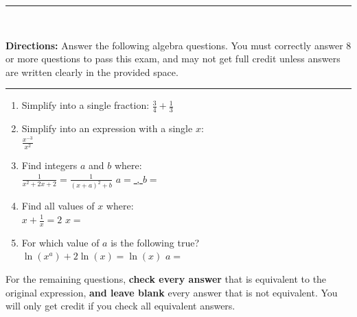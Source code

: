 \documentclass{article}
\makeatletter
\def\saveenum{\xdef\@savedenum{\the\c@enumi\relax}}
\def\resetenum{\global\c@enumi\@savedenum}
\makeatother
\begin{document}
\pagestyle{empty}
\hrule\ \\
{{\bf Directions:} Answer the following algebra questions.  You must correctly answer 8 or more questions to pass this exam, and may not get full credit unless answers are written clearly in the provided space.\\

\hrule
\begin{enumerate}
\item Simplify into a single fraction:
 $\frac{3}{4} + \frac{1}{3}$\\
\- \hfill \underline{\hspace{2 in}} 
%
%
\item Simplify into an expression with a single $x$:  \,\\[.1 in]
$\displaystyle \frac{x^{-3}}{x^2}$\hfill \underline{\hspace{2 in}}
%
%
\item Find integers $a$ and $b$ where:  \,\\[.1 in]
$\displaystyle \frac{1}{x^2 + 2x + 2} = \frac{1}{(x + a)^2 + b}$ \hfill \underline{$a =$ \hspace{1 in}, $b =$ \hspace{1in}}
%
%
\item Find all values of $x$ where:  \,\\[.1 in]
$\displaystyle x  + \frac{1}{x} = 2$ \hfill \underline{$x =$ \hspace{2 in}}
%
%
\item For which value of $a$ is the following true? \,\\[.1 in]
$\displaystyle \ln(x^a) + 2\ln(x) = \ln(x)$ \hfill \underline{$a =$ \hspace{2 in}}
%
%
\end{enumerate}
\saveenum
For the remaining questions, {\bf check every answer} that is equivalent to the original expression, {\bf and leave blank} every answer that is not equivalent.  You will only get credit if you check all equivalent answers.
}
\end{document}
